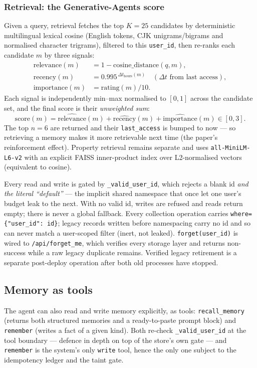 \documentclass[11pt,a4paper]{article}
\newcommand{\code}[1]{\texttt{\small #1}}
\begin{document}
\subsubsection*{Retrieval: the Generative-Agents score}
Given a query, retrieval fetches the top $K=25$ candidates by deterministic
multilingual lexical cosine (English tokens, CJK unigrams/bigrams and normalised
character trigrams), filtered to this \code{user\_id}, then re-ranks each candidate
$m$ by three signals:
\begin{align*}
  \text{relevance}(m) &= 1 - \text{cosine\_distance}(q, m),\\
  \text{recency}(m)   &= 0.995^{\,\Delta t_{\text{hours}}(m)}
                         \quad(\Delta t \text{ from last access}),\\
  \text{importance}(m)&= \text{rating}(m)/10.
\end{align*}
Each signal is independently min--max normalised to $[0,1]$ across the candidate set,
and the final score is their \emph{unweighted sum}:
\[
  \mathrm{score}(m) = \widehat{\text{relevance}}(m) +
  \widehat{\text{recency}}(m) + \widehat{\text{importance}}(m) \in [0,3].
\]
The top $n=6$ are returned and their \code{last\_access} is bumped to now --- so
retrieving a memory makes it more retrievable next time (the paper's reinforcement
effect). Property retrieval remains separate and uses \code{all-MiniLM-L6-v2} with
an explicit FAISS inner-product index over L2-normalised vectors (equivalent to cosine).

\begin{keybox}
Every read and write is gated by \code{\_valid\_user\_id}, which rejects a blank id
\emph{and the literal ``default''} --- the implicit shared namespace that once let one
user's budget leak to the next. With no valid id, writes are refused and reads return
empty; there is never a global fallback. Every collection operation carries
\code{where=\{"user\_id": id\}}; legacy records written before namespacing carry no id
and so can never match a user-scoped filter (inert, not leaked). \code{forget(user\_id)}
is wired to \code{/api/forget\_me}, which verifies every storage layer and returns
non-success while a raw legacy duplicate remains. Verified legacy retirement is a
separate post-deploy operation after both old processes have stopped.
\end{keybox}

\subsection{Memory as tools}
The agent can also read and write memory explicitly, as tools: \code{recall\_memory}
(returns both structured memories and a ready-to-paste prompt block) and
\code{remember} (writes a fact of a given kind). Both re-check \code{\_valid\_user\_id}
at the tool boundary --- defence in depth on top of the store's own gate --- and
\code{remember} is the system's only \code{write} tool, hence the only one subject to
the idempotency ledger and the taint gate.
\end{document}
